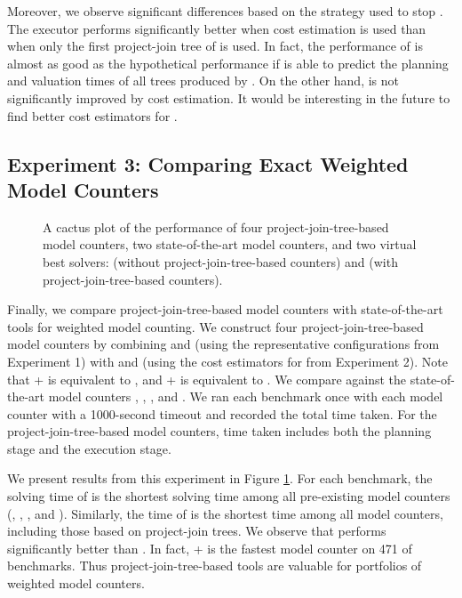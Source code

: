 Moreover, we observe significant differences based on the strategy used to stop \Lg{}.
The executor \Tensor{} performs significantly better when cost estimation is used than when only the first project-join tree of \Lg{} is used.
In fact, the performance of \Tensor{} is almost as good as the hypothetical performance if \Tensor{} is able to predict the planning and valuation times of all trees produced by \Lg{}.
On the other hand, \Dmc{} is not significantly improved by cost estimation.
It would be interesting in the future to find better cost estimators for \Dmc{}.


\subsection{Experiment 3: Comparing Exact Weighted Model Counters}
\label{sec_experiments_wmc}

\begin{figure}[t]
	\centering
	
    \vspace*{-1cm}
	\caption{\label{fig:comparison} A cactus plot of the performance of four project-join-tree-based model counters, two state-of-the-art model counters, and two virtual best solvers:  (without project-join-tree-based counters) and  (with project-join-tree-based counters).}
\end{figure}

Finally, we compare project-join-tree-based model counters with state-of-the-art tools for weighted model counting.
We construct four project-join-tree-based model counters by combining \Htb{} and \Lg{} (using the representative configurations from Experiment 1) with \Dmc{} and \Tensor{} (using the cost estimators for \Lg{} from Experiment 2).
Note that \Dmc{}+\Htb{} is equivalent to  \cite{dudek2020addmc}, and \Tensor{}+\Lg{} is equivalent to  \cite{dudek2019efficient}.
We compare against the state-of-the-art model counters \cachet{} \cite{sang2004combining}, \ctd{} \cite{darwiche2004new}, \df{} \cite{lagniez2017improved}, and \minictd{} \cite{oztok2015top}.
We ran each benchmark once with each model counter with a 1000-second timeout and recorded the total time taken.
For the project-join-tree-based model counters, time taken includes both the planning stage and the execution stage.

We present results from this experiment in Figure \ref{fig:comparison}.
For each benchmark, the solving time of  is the shortest solving time among all pre-existing model counters (\cachet, \ctd, \df, and \minictd).
Similarly, the time of  is the shortest time among all model counters, including those based on project-join trees.
We observe that  performs significantly better than .
In fact, \Dmc{}+\Lg{} is the fastest model counter on 471
of \benchmarkCountAltogether{}
benchmarks.
Thus project-join-tree-based tools are valuable for portfolios of weighted model counters.
